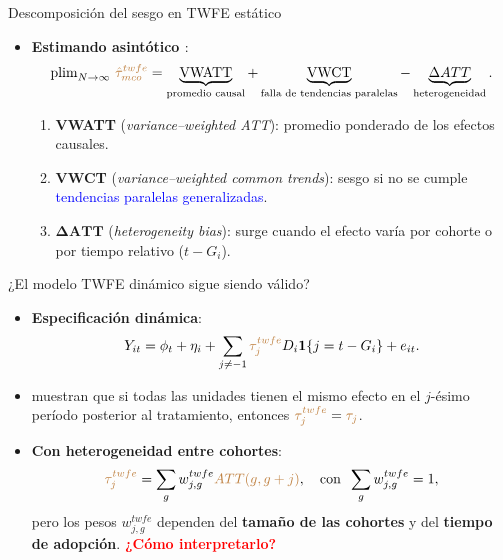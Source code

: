\documentclass[10pt, xcolor=dvipsnames]{beamer}
\begin{document}
\begin{frame}{Descomposición del sesgo en TWFE estático}
\begin{itemize}\setlength{\itemsep}{1em}
    \item \textbf{Estimando asintótico \citep{Goodman-Bacon2021}}:
    \[
        \operatorname{plim}_{N\to\infty}\,\textcolor{brown}{\hat\tau^{twfe}_{mco}}
        =
        \underbrace{\text{VWATT}}_{\text{promedio causal}}
        +
        \underbrace{\text{VWCT}}_{\text{falla de tendencias paralelas}}
        -
        \underbrace{\Delta ATT}_{\text{heterogeneidad}}.
    \]
    \begin{enumerate}\setlength{\itemsep}{0.25em}
        \item \textbf{VWATT} (\emph{variance–weighted ATT}): promedio ponderado de los efectos causales. %
        \item \textbf{VWCT} (\emph{variance–weighted common trends}): sesgo si no se cumple \textcolor{blue}{tendencias paralelas generalizadas}. %
        \item \(\boldsymbol{\Delta ATT}\) (\emph{heterogeneity bias}): surge cuando el efecto varía por cohorte o por tiempo relativo (\(t-G_i\)).
    \end{enumerate}
\end{itemize}
\end{frame}


\begin{frame}{¿El modelo TWFE dinámico sigue siendo válido?}
\begin{itemize}\setlength{\itemsep}{0.8em}
    \item \textbf{Especificación dinámica}:
    \begin{align*}
        Y_{it} = \phi_t + \eta_i + \sum_{j\neq -1} \textcolor{brown}{\tau^{twfe}_j} D_i \mathbf{1}\{j=t-G_i\} + e_{it}.
    \end{align*}
    \item \citet{sun_estimating_2021} muestran que si todas las unidades tienen el mismo efecto en el \(j\)-ésimo período posterior al tratamiento, entonces \(\textcolor{brown}{\tau^{twfe}_j}=\textcolor{brown}{\tau_j}\).
   \item \textbf{Con heterogeneidad entre cohortes}:
    \[
      \textcolor{brown}{\tau^{twfe}_{j}} = \sum_{g} w^{twfe}_{j,g} \textcolor{brown}{ATT(g,g+j)}, \quad \text{con} \;\; \sum_g w^{twfe}_{j,g}=1,
    \]
    pero los pesos \(w^{twfe}_{j,g}\) dependen del \textbf{tamaño de las cohortes} y del \textbf{tiempo de adopción}. \textcolor{red}{\textbf{¿Cómo interpretarlo?}}
\end{itemize}
\end{frame}
\end{document}

